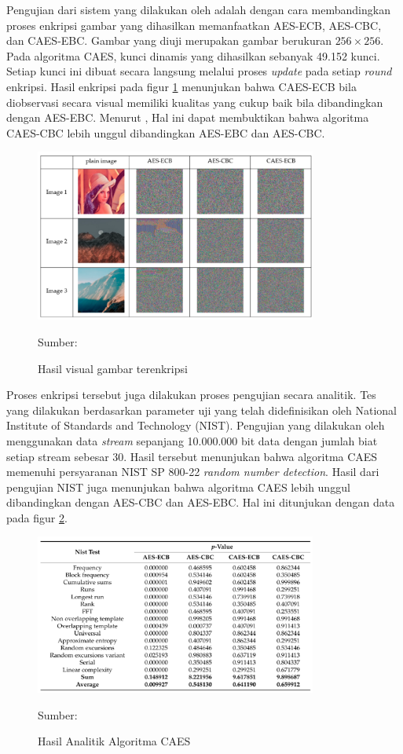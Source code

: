 Pengujian dari sistem yang dilakukan oleh \textcite{lin2021} adalah dengan cara membandingkan proses enkripsi gambar yang dihasilkan memanfaatkan AES-ECB, AES-CBC, dan CAES-EBC. Gambar yang diuji merupakan gambar berukuran $256 \times 256$. Pada algoritma CAES, kunci dinamis yang dihasilkan sebanyak 49.152 kunci. Setiap kunci ini dibuat secara langsung melalui proses \emph{update} pada setiap \emph{round} enkripsi. Hasil enkripsi pada figur \ref{fig:lin.result} menunjukan bahwa CAES-ECB bila diobservasi secara visual memiliki kualitas yang cukup baik bila dibandingkan dengan AES-EBC. Menurut \textcite{lin2021}, Hal ini dapat membuktikan bahwa algoritma CAES-CBC lebih unggul dibandingkan AES-EBC dan AES-CBC.

\begin{figure}[!h]
  \centering
  \includegraphics[width=350px]{chapters/res/chapter-2/img/lin.res.png}
  \caption{Hasil visual gambar terenkripsi} \label{fig:lin.result}
  Sumber: \textcite{lin2021}
\end{figure}

Proses enkripsi tersebut juga dilakukan proses pengujian secara analitik. Tes yang dilakukan berdasarkan parameter uji yang telah didefinisikan oleh National Institute of Standards and Technology (NIST). Pengujian yang dilakukan oleh \textcite{lin2021} menggunakan data \emph{stream} sepanjang 10.000.000 bit data dengan jumlah biat setiap stream sebesar 30. Hasil tersebut menunjukan bahwa algoritma CAES memenuhi persyaranan NIST SP 800-22 \emph{random number detection}. Hasil dari pengujian NIST juga menunjukan bahwa algoritma CAES lebih unggul dibandingkan dengan AES-CBC dan AES-EBC. Hal ini ditunjukan dengan data pada figur \ref{fig:lin.analytic-result}.

\begin{figure}[!h]
  \centering
  \includegraphics[width=350px]{chapters/res/chapter-2/img/lin.analytic-test.png}
  \caption{Hasil Analitik Algoritma CAES} \label{fig:lin.analytic-result}
  Sumber: \textcite{lin2021}
\end{figure}

